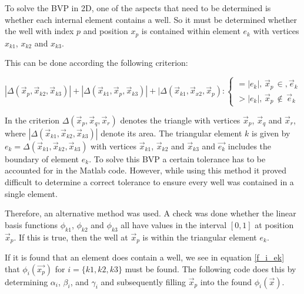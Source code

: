 \documentclass[a4paper]{report}
\begin{document}
To solve the BVP in 2D, one of the aspects that need to be determined is whether each internal element contains a well. So it must be determined whether the well with index $p$ and position $x_p$ is contained within element $e_k$ with vertices $x_{k1}$, $x_{k2}$ and $x_{k3}$. 

This can be done according the following criterion:

\begin{equation}
|\Delta(\vec{x}_p,\vec{x}_{k2},\vec{x}_{k3})|+|\Delta(\vec{x}_{k1},\vec{x}_p,\vec{x}_{k3})|+|\Delta(\vec{x}_{k1},\vec{x}_{x2},\vec{x}_p):
	\begin{cases} 
	=|e_k|,\, \vec{x}_p\, \in, \vec{e}_k\\ 
	>|e_k|,\, \vec{x}_p\, \notin\,\vec{e}_k
	\end{cases} 
\end{equation}

In the criterion $\Delta(\vec{x}_p,\vec{x}_q,\vec{x}_r)$ denotes the triangle with vertices $\vec{x}_p$, $\vec{x}_q$ and $\vec{x}_r$, where $|\Delta(\vec{x}_{k1},\vec{x}_{k2},\vec{x}_{k3})|$ denote its area. The triangular element $k$ is given by $e_k=\Delta(\vec{x}_{k1},\vec{x}_{k2},\vec{x}_{k3})$ with vertices  $\vec{x}_{k1}$, $\vec{x}_{k2}$ and $\vec{x}_{k3}$ and $\vec{e_k}$ includes the boundary of element $e_k$. To solve this BVP a certain tolerance has to be accounted for in the Matlab code. However, while using this method it proved difficult to determine a correct tolerance to ensure every well was contained in a single element.

Therefore, an alternative method was used. A check was done whether the linear basis functions $\phi_{k1}$, $\phi_{k2}$ and $\phi_{k3}$ all have values in the interval $ [0,1] $ at position $\vec{x}_p$. If this is true, then the well at $\vec{x}_p$ is within the triangular element $e_k$.

If it is found that an element does contain a well, we see in equation \eqref{f_i_ek} that $\phi_i(\vec{x_p})$ for $i = \{k1, k2, k3\}$ must be found. The following code does this by determining $\alpha_i$, $\beta_i$, and $\gamma_i $ and subsequently filling $\vec{x}_p$ into the found $\phi_i(\vec{x})$.
\end{document}
